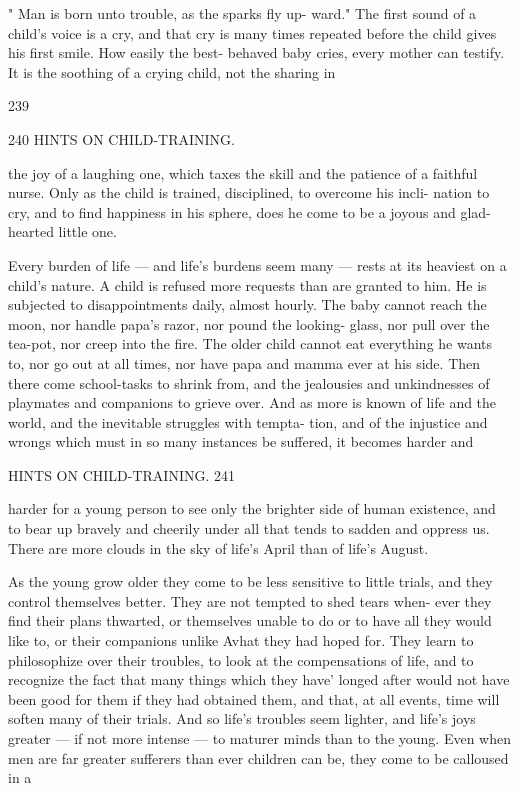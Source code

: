 \documentclass[
]{book}
\begin{document}
" Man is born unto trouble, as the sparks fly up- ward." The first sound of a child's voice is a cry, and that cry is many times repeated before the child gives his first smile. How easily the best- behaved baby cries, every mother can testify. It is the soothing of a crying child, not the sharing in

239

240 HINTS ON CHILD-TRAINING.

the joy of a laughing one, which taxes the skill and the patience of a faithful nurse. Only as the child is trained, disciplined, to overcome his incli- nation to cry, and to find happiness in his sphere, does he come to be a joyous and glad-hearted little one.

Every burden of life --- and life's burdens seem many --- rests at its heaviest on a child's nature. A child is refused more requests than are granted to him. He is subjected to disappointments daily, almost hourly. The baby cannot reach the moon, nor handle papa's razor, nor pound the looking- glass, nor pull over the tea-pot, nor creep into the fire. The older child cannot eat everything he wants to, nor go out at all times, nor have papa and mamma ever at his side. Then there come school-tasks to shrink from, and the jealousies and unkindnesses of playmates and companions to grieve over. And as more is known of life and the world, and the inevitable struggles with tempta- tion, and of the injustice and wrongs which must in so many instances be suffered, it becomes harder and

HINTS ON CHILD-TRAINING. 241

harder for a young person to see only the brighter side of human existence, and to bear up bravely and cheerily under all that tends to sadden and oppress us. There are more clouds in the sky of life's April than of life's August.

As the young grow older they come to be less sensitive to little trials, and they control themselves better. They are not tempted to shed tears when- ever they find their plans thwarted, or themselves unable to do or to have all they would like to, or their companions unlike Avhat they had hoped for. They learn to philosophize over their troubles, to look at the compensations of life, and to recognize the fact that many things which they have' longed after would not have been good for them if they had obtained them, and that, at all events, time will soften many of their trials. And so life's troubles seem lighter, and life's joys greater --- if not more intense --- to maturer minds than to the young. Even when men are far greater sufferers than ever children can be, they come to be calloused in a
\end{document}
